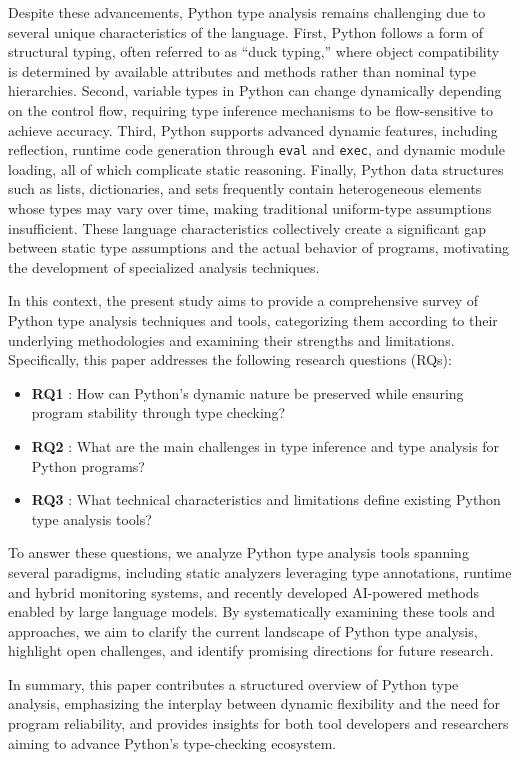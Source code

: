 Despite these advancements, Python type analysis remains challenging due to
several unique characteristics of the language.
First, Python follows a form of structural typing, often referred to as “duck
typing,” where object compatibility is determined by available attributes and
methods rather than nominal type hierarchies.
Second, variable types in Python can change dynamically depending on the
control flow, requiring type inference mechanisms to be flow-sensitive to
achieve accuracy.
Third, Python supports advanced dynamic features, including reflection, runtime
code generation through \texttt{eval} and \texttt{exec}, and dynamic module
loading, all of which complicate static reasoning.
Finally, Python data structures such as lists, dictionaries, and sets
frequently contain heterogeneous elements whose types may vary over time,
making traditional uniform-type assumptions insufficient.
These language characteristics collectively create a significant gap between
static type assumptions and the actual behavior of programs, motivating the
development of specialized analysis techniques.

In this context, the present study aims to provide a comprehensive survey of
Python type analysis techniques and tools, categorizing them according to their
underlying methodologies and examining their strengths and limitations.
Specifically, this paper addresses the following research questions (RQs):

\begin{itemize}
  \item \textbf{RQ1} : How can Python’s dynamic nature be
    preserved while ensuring program stability through type checking?
  \item \textbf{RQ2} : What are the main challenges in type inference and type
    analysis for Python programs?
  \item \textbf{RQ3} : What technical characteristics and limitations define
    existing Python type analysis tools?
\end{itemize}

To answer these questions, we analyze Python type analysis tools spanning
several paradigms, including static analyzers leveraging type annotations,
runtime and hybrid monitoring systems, and recently developed AI-powered
methods enabled by large language models.
By systematically examining these tools and approaches, we aim to clarify the
current landscape of Python type analysis, highlight open challenges, and
identify promising directions for future research.

In summary, this paper contributes a structured overview of Python type
analysis, emphasizing the interplay between dynamic flexibility and the need
for program reliability, and provides insights for both tool developers and
researchers aiming to advance Python’s type-checking ecosystem.


